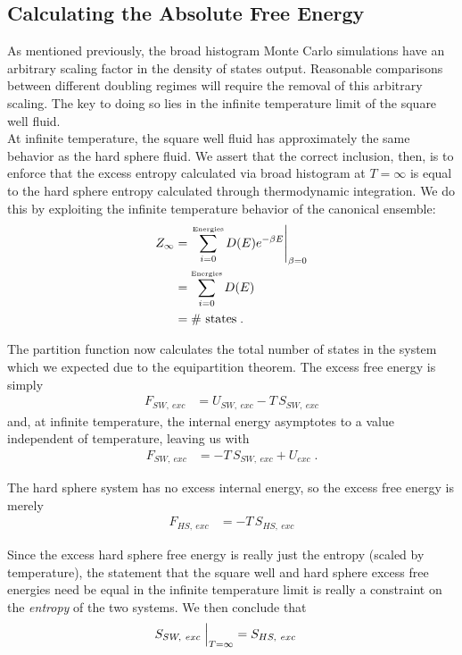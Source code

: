 \documentclass[12pt]{article}
\begin{document}
\subsection{Calculating the Absolute Free Energy}
As mentioned previously, the broad histogram Monte Carlo simulations have an arbitrary scaling factor in the density of states output. Reasonable comparisons between different doubling regimes will require  the removal of this arbitrary scaling. The key to doing so lies in the infinite temperature limit of the square well fluid.\\

At infinite temperature, the square well fluid has approximately the same behavior as the hard sphere fluid. We assert that the correct inclusion, then, is to enforce that the excess entropy calculated via broad histogram at $T=\infty$ is equal to the hard sphere entropy calculated through thermodynamic integration. We do this by exploiting the infinite temperature behavior of the canonical ensemble:
\begin{align}
    Z_{\infty} &= \left.\sum_{i=0}^{\text{\tiny Energies}} D(E) e^{-\beta E}\right|_{\beta = 0}\\
    &= \sum_{i=0}^{\text{\tiny Energies}} D(E)\\
    &= \#\text{~states}\;.
\end{align}

The partition function now calculates the total number of states in the system which we expected due to the equipartition theorem. The excess free energy is simply
\begin{align}
    F_{SW,~exc} &= U_{SW,~exc} - T\,S_{SW,~exc}     
\end{align} 
and, at infinite temperature, the internal energy asymptotes to a value independent of temperature, leaving us with
\begin{align}
    F_{SW,~exc} &= -T\,S_{SW, ~exc} + U_{exc}\;.
\end{align}

The hard sphere system has no excess internal energy, so the excess free energy is merely
\begin{align}
     F_{HS,~exc} &= -T\,S_{HS,~exc} 
\end{align} 

Since the excess hard sphere free energy is really just the entropy \cite{valeskethesis} (scaled by temperature), the statement that the square well and hard sphere excess free energies need be equal in the infinite temperature limit is really a constraint on the {\it entropy} of the two systems. We then conclude that
\begin{align}
    S_{SW,~exc} \Bigm\lvert_{T=\infty} &= S_{HS,~exc}
\end{align}
\end{document}
